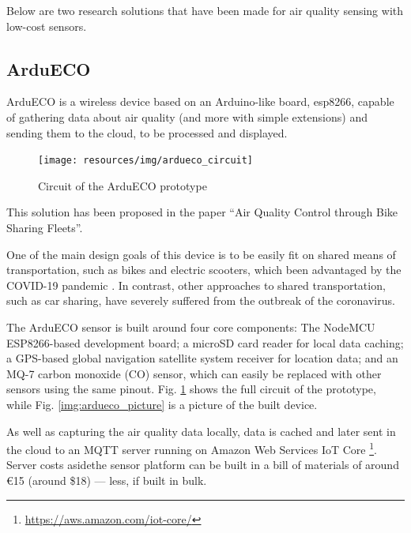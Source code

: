		Below are two research solutions that have been made for air quality sensing with low-cost sensors.
			
		\subsection{ArduECO}\label{subsec:ardueco}
			
			ArduECO is a wireless device based on an Arduino-like board, esp8266, capable of gathering data about air quality (and more with simple extensions) and sending them to the cloud, to be processed and displayed.

			\begin{figure}
				\centering
				\texttt{[image: resources/img/ardueco\_circuit]}
				\caption{Circuit of the ArduECO prototype}
				\label{img:ardueco_circuit}
			\end{figure}
			
			This solution has been proposed in the paper ``Air Quality Control through Bike Sharing Fleets''\cite{ardueco_paper}.
			
			One of the main design goals of this device is to be easily fit on shared means of transportation, such as bikes and electric scooters, which been advantaged by the COVID-19 pandemic \cite{HU2021102997}.
			In contrast, other approaches to shared transportation, such as car sharing, have severely suffered from the outbreak of the coronavirus.
			
			The ArduECO sensor is built around four core components: The NodeMCU ESP8266-based development board; a microSD card reader for local data caching; a GPS-based global navigation satellite system receiver for location data; and an MQ-7 carbon monoxide (CO) sensor, which can easily be replaced with other sensors using the same pinout.
			Fig. \ref{img:ardueco_circuit} shows the full circuit of the prototype, while Fig. \ref{img:ardueco_picture} is a picture of the built device.
			
			As well as capturing the air quality data locally, data is cached and later sent in the cloud to an MQTT server running on Amazon Web Services IoT Core \footnote{\url{https://aws.amazon.com/iot-core/}}.
			Server costs asidethe sensor platform can be built in a bill of materials of around €15 (around \$18) — less, if built in bulk.
			
